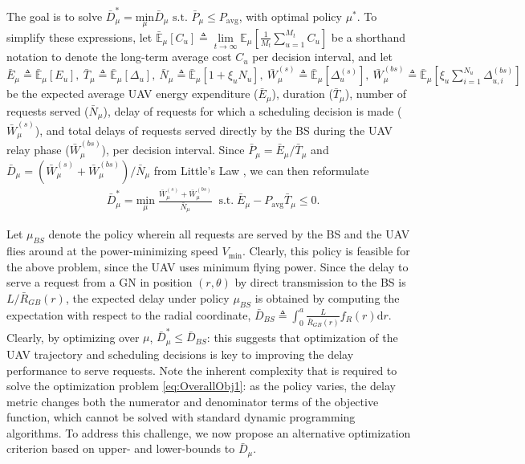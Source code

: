 \documentclass[12pt, draftcls, onecolumn]{IEEEtran}
\theoremstyle{plain}
\theoremstyle{definition}
\theoremstyle{remark}
\begin{document}
The goal is to solve $\bar{D}_{\mu}^{*}{=}\underset{\mu}{\mathrm{min}}\bar{D}_{\mu}\text{ s.t. }\bar{P}_{\mu}{\leq}P_{\mathrm{avg}}$, with optimal policy $\mu^{*}$. To simplify these expressions, let
$\bar{\mathbb{E}}_{\mu}[C_u]\triangleq\lim\limits_{t \rightarrow \infty} \mathbb{E}_{\mu}
[\frac{1}{M_t} \sum_{u = 1}^{M_t }C_u]$ be a shorthand notation to denote the long-term average cost $C_u$ per decision interval, and let
$\bar{E}_{\mu}{\triangleq}\bar{\mathbb{E}}_{\mu} \left[E_u\right],\ \bar{T}_{\mu}{\triangleq}\bar{\mathbb{E}}_{\mu} \left[\Delta_u\right],\ \bar{N}_{\mu}{\triangleq}\bar{\mathbb{E}}_{\mu} \left[1+\xi_uN_u\right],\ \bar{W}_{\mu}^{(s)}{\triangleq}\bar{\mathbb{E}}_{\mu}\left[\Delta_u^{(s)}\right],\ \bar{W}_{\mu}^{(bs)}{\triangleq}\bar{\mathbb{E}}_{\mu}[\xi_u\sum_{i=1}^{N_u}\Delta_{u,i}^{(bs)}]$ be the expected average UAV energy expenditure ($\bar{E}_{\mu}$), duration ($\bar{T}_{\mu}$), number of requests served ($\bar{N}_{\mu}$), delay of requests for which a scheduling decision is made ($\bar{W}_{\mu}^{(s)}$), and total delays of requests served directly by the BS during the UAV relay phase
($\bar{W}_{\mu}^{(bs)}$), per decision interval. 
Since $\bar{P}_{\mu}{=}\bar{E}_{\mu}/\bar{T}_{\mu}$ and $\bar{D}_{\mu}{=}(\bar{W}_{\mu}^{(s)}+\bar{W}_{\mu}^{(bs)})/\bar{N}_{\mu}$ from Little's Law \cite{LittlesLaw},
we can then reformulate
\begin{align}\label{eq:OverallObj1}
    &\bar{D}_{\mu}^{*} = \underset{\mu}{\mathrm{min}} \; 
	\frac{\bar{W}_{\mu}^{(s)}+\bar{W}_{\mu}^{(bs)}}{\bar{N}_{\mu}}\;\;
	\mathrm{s.t.} \; \bar{E}_{\mu}-P_{\mathrm{avg}}\bar{T}_{\mu}\leq 0.
\end{align}

Let $\mu_{BS}$ denote the policy wherein all requests are served by the BS and the UAV flies around at the power-minimizing speed $V_{\mathrm{min}}$. Clearly, this policy is feasible for the above problem, since the UAV uses minimum flying power.
Since the delay to serve a request from a GN in position $(r,\theta)$ by direct transmission to the BS is $L/\bar R_{GB}(r)$,  the expected delay under policy $\mu_{BS}$ is obtained by computing the expectation with respect to the radial coordinate, $\bar{D}_{BS}{\triangleq}\int_{0}^{a}\frac{L}{\bar{R}_{GB}(r)}f_{R}(r)\mathrm{d}r$. Clearly, by optimizing over $\mu$, $\bar{D}_{\mu}^{*}{\leq}\bar{D}_{BS}$: this suggests that optimization of the UAV trajectory and scheduling decisions is key to improving the delay performance to serve requests. Note the inherent complexity that is required to solve the optimization problem \eqref{eq:OverallObj1}: as the policy varies, the delay metric changes both the numerator and denominator terms of the objective function, which cannot be solved with standard dynamic programming algorithms. To address this challenge, we now propose an alternative optimization criterion based on upper- and lower-bounds to $\bar{D}_{\mu}$.
\end{document}
